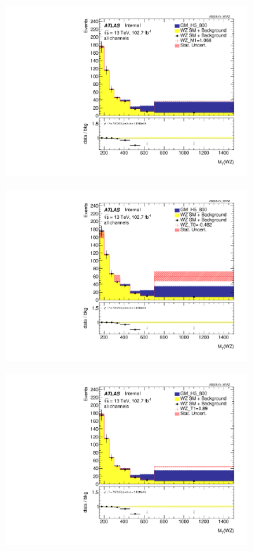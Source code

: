 \documentclass[../Bachelorarbeit.tex]{subfiles}
\begin{document}
\begin{figure}[h]
\begin{subfigure}{0.3\textwidth}
        \includegraphics[width=\textwidth]{Plots/ALL_MTWZ_final/GM_H5_800/M1/2022-05-07/VBSSR/all_VV_MTWZ.pdf}
    \end{subfigure}
    \begin{subfigure}{0.3\textwidth}
        \includegraphics[width=\textwidth]{Plots/ALL_MTWZ_final/GM_H5_800/T0/2022-05-07/VBSSR/all_VV_MTWZ.pdf}
    \end{subfigure}
    \begin{subfigure}{0.3\textwidth}
        \includegraphics[width=\textwidth]{Plots/ALL_MTWZ_final/GM_H5_800/T1/2022-05-07/VBSSR/all_VV_MTWZ.pdf}

\end{subfigure}
\end{figure}
\end{document}
